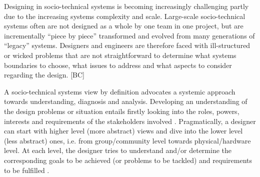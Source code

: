  Designing in socio-technical systems is becoming increasingly challenging partly due to the increasing systems complexity and scale.  
Large-scale socio-technical systems often are not designed as a whole by one team in one project, but are incrementally ``piece by piece'' transformed and evolved from many generations of ``legacy'' systems. Designers and engineers are therefore faced with ill-structured or wicked problems that are not straightforward to determine what systems boundaries to choose, what issues to address and what aspects to consider regarding the design. [BC]

A socio-technical systems view by definition advocates a systemic approach towards understanding, diagnosis and analysis. Developing an understanding of the design problems or situation entails firstly looking into the roles, powers, interests and requirements of the stakeholders involved \cite{Checkland1981}. 
Pragmatically, a designer can start with higher level (more abstract) views and dive into the lower level (less abstract) ones, i.e. from group/community level towards physical/hardware level.
At each level, the designer tries to understand and/or determine the corresponding goals to be achieved (or problems to be tackled) \cite{Checkland1981,Waterson2002} and requirements to be fulfilled \cite{Whitworth2009a}. 

